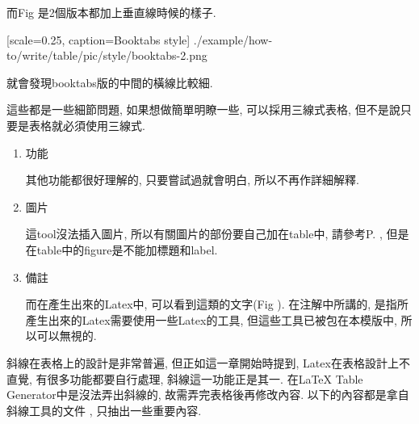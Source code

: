   而Fig 是2個版本都加上垂直線時候的樣子.

    {
      [scale=0.25,
      caption={Booktabs style}]
      {./example/how-to/write/table/pic/style/booktabs-2.png}
    }

  就會發現booktabs版的中間的橫線比較細.

  這些都是一些細節問題, 如果想做簡單明瞭一些, 可以採用三線式表格, 但不是說只要是表格就必須使用三線式.

{}

  \begin{enumerate}

  \item
  {
    功能

    其他功能都很好理解的, 只要嘗試過就會明白, 所以不再作詳細解釋.
  } %

  \item
  {
    圖片

    這tool沒法插入圖片, 所以有關圖片的部份要自己加在table中, 請參考P. , 但是在table中的figure是不能加標題和label.
  } %

  \item
  {
    備註

    而在產生出來的Latex中, 可以看到這類的文字(Fig ). 在注解中所講的, 是指所產生出來的Latex需要使用一些Latex的工具, 但這些工具已被包在本模版中, 所以可以無視的.

  } %
  \end{enumerate}

\newpage
{}

斜線在表格上的設計是非常普遍, 但正如這一章開始時提到, Latex在表格設計上不直覺, 有很多功能都要自行處理, 斜線這一功能正是其一. 在LaTeX Table Generator中是沒法弄出斜線的, 故需弄完表格後再修改內容. 以下的內容都是拿自斜線工具的文件 , 只抽出一些重要內容.

